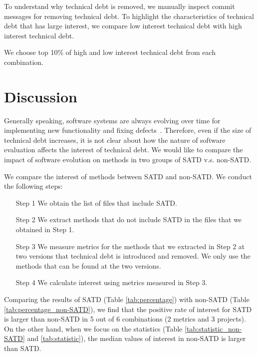 To understand why technical debt is removed, we manually inspect commit messages for removing technical debt. To highlight the characteristics of technical debt that has large interest, we compare low interest technical debt with high interest technical debt.

We choose top 10\% of high and low interest technical debt from each combination.





\section{Discussion}

Generally speaking, software systems are always evolving over time for implementing new functionality and fixing defects~\cite{xxx}.
Therefore, even if the size of technical debt increases, it is not clear about how the nature of software evaluation affects the interest of technical debt.
We would like to compare the impact of software evolution on methods in two groups of SATD v.s. non-SATD.

We compare the interest of methods between SATD and non-SATD.
We conduct the following steps:
\begin{itemize}
\item [Step 1] We obtain the list of files that include SATD. %
\item [Step 2] We extract methods that do not include SATD in the files that we obtained in Step 1. %
\item [Step 3] We measure metrics for the methods that we extracted in Step 2 at two versions that technical debt is introduced and removed. We only use the methods that can be found at the two versions.
\item [Step 4] We calculate interest using metrics measured in Step 3.
\end{itemize}

Comparing the results of SATD (Table \ref{tab:percentage}) with non-SATD (Table \ref{tab:percentage_non-SATD}), we find that the positive rate of interest for SATD is larger than non-SATD in 5 out of 6 combinations (2 metrics and 3 projects). On the other hand, when we focus on the statistics (Table \ref{tab:statistic_non-SATD} and \ref{tab:statistic}), the median values of interest in non-SATD is larger than SATD.



